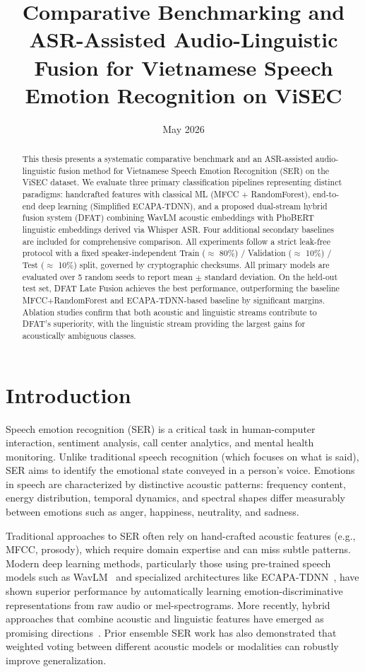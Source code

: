 \documentclass[12pt,a4paper]{report}
\title{Comparative Benchmarking and ASR-Assisted Audio-Linguistic Fusion for Vietnamese Speech Emotion Recognition on ViSEC}
\date{May 2026}
\begin{document}
\maketitle

\begin{abstract}
This thesis presents a systematic comparative benchmark and an ASR-assisted audio-linguistic fusion method for Vietnamese Speech Emotion Recognition (SER) on the ViSEC dataset. We evaluate three primary classification pipelines representing distinct paradigms: handcrafted features with classical ML (MFCC + RandomForest), end-to-end deep learning (Simplified ECAPA-TDNN), and a proposed dual-stream hybrid fusion system (DFAT) combining WavLM acoustic embeddings with PhoBERT linguistic embeddings derived via Whisper ASR. Four additional secondary baselines are included for comprehensive comparison. All experiments follow a strict leak-free protocol with a fixed speaker-independent Train ($\approx$ 80\%) / Validation ($\approx$ 10\%) / Test ($\approx$ 10\%) split, governed by cryptographic checksums. All primary models are evaluated over 5 random seeds to report mean $\pm$ standard deviation. On the held-out test set, DFAT Late Fusion achieves the best performance, outperforming the baseline MFCC+RandomForest and ECAPA-TDNN-based baseline by significant margins. Ablation studies confirm that both acoustic and linguistic streams contribute to DFAT's superiority, with the linguistic stream providing the largest gains for acoustically ambiguous classes.
\end{abstract}

\tableofcontents

\chapter{Introduction}
Speech emotion recognition (SER) is a critical task in human-computer interaction, sentiment analysis, call center analytics, and mental health monitoring. Unlike traditional speech recognition (which focuses on what is said), SER aims to identify the emotional state conveyed in a person's voice. Emotions in speech are characterized by distinctive acoustic patterns: frequency content, energy distribution, temporal dynamics, and spectral shapes differ measurably between emotions such as anger, happiness, neutrality, and sadness.

Traditional approaches to SER often rely on hand-crafted acoustic features (e.g., MFCC, prosody), which require domain expertise and can miss subtle patterns. Modern deep learning methods, particularly those using pre-trained speech models such as WavLM~\cite{wavlm} and specialized architectures like ECAPA-TDNN~\cite{ecapa}, have shown superior performance by automatically learning emotion-discriminative representations from raw audio or mel-spectrograms. More recently, hybrid approaches that combine acoustic and linguistic features have emerged as promising directions~\cite{ser_multimodal}. Prior ensemble SER work has also demonstrated that weighted voting between different acoustic models or modalities can robustly improve generalization.
\end{document}
